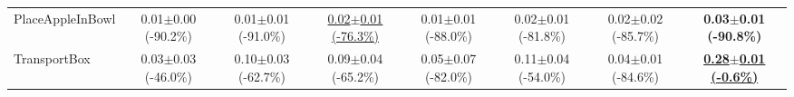 \begin{table}[htbp]
\begin{adjustbox}{max width=\textwidth}
\begin{tabular}{l*{7}{c}}
PlaceAppleInBowl & 0.01$\pm$0.00 \scriptsize{(-90.2\%)} & 0.01$\pm$0.01 \scriptsize{(-91.0\%)} & \underline{0.02$\pm$0.01 \scriptsize{(-76.3\%)}} & 0.01$\pm$0.01 \scriptsize{(-88.0\%)} & 0.02$\pm$0.01 \scriptsize{(-81.8\%)} & 0.02$\pm$0.02 \scriptsize{(-85.7\%)} & \textbf{0.03$\pm$0.01 \scriptsize{(-90.8\%)}} \\
TransportBox & 0.03$\pm$0.03 \scriptsize{(-46.0\%)} & 0.10$\pm$0.03 \scriptsize{(-62.7\%)} & 0.09$\pm$0.04 \scriptsize{(-65.2\%)} & 0.05$\pm$0.07 \scriptsize{(-82.0\%)} & 0.11$\pm$0.04 \scriptsize{(-54.0\%)} & 0.04$\pm$0.01 \scriptsize{(-84.6\%)} & \textbf{\underline{0.28$\pm$0.01 \scriptsize{(-0.6\%)}}} \\
\bottomrule
\end{tabular}
\end{adjustbox}
\end{table}

